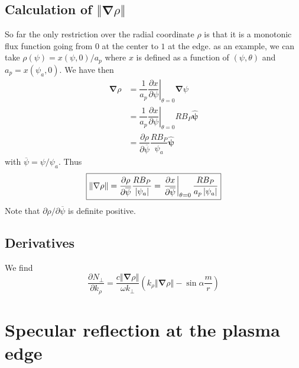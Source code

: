 \documentclass[a4paper,12pt]{article}%
\begin{document}
\subsection{Calculation of $\left\Vert \mathbf{\nabla}\rho\right\Vert $}

So far the only restriction over the radial coordinate $\rho$ is that it is a
monotonic flux function going from $0$ at the center to $1$ at the edge. as an
example, we can take $\rho\left(  \psi\right)  =x\left(  \psi,0\right)
/a_{p}$ where $x$ is defined as a function of $\left(  \psi,\theta\right)  $
and $a_{p}=x\left(  \psi_{a},0\right)  $. We have then
\begin{align}
\mathbf{\nabla}\rho &  =\dfrac{1}{a_{p}}\left.  \dfrac{\partial x}%
{\partial\psi}\right\vert _{\theta=0}\mathbf{\nabla}\psi\\
&  =\dfrac{1}{a_{p}}\left.  \dfrac{\partial x}{\partial\psi}\right\vert
_{\theta=0}RB_{P}\widehat{\mathbf{\psi}}\\
&  =\dfrac{\partial\rho}{\partial\overline{\psi}}\dfrac{RB_{P}}{\psi_{a}%
}\widehat{\mathbf{\psi}}%
\end{align}
with $\overline{\psi}=\psi/\psi_{a}$. Thus%
\begin{equation}
\fbox{$\left\Vert \mathbf{\nabla}\rho\right\Vert =\dfrac{\partial\rho
}{\partial\overline{\psi}}\dfrac{RB_{P}}{\left\vert \psi_{a}\right\vert
}=\left.  \dfrac{\partial x}{\partial\overline{\psi}}\right\vert _{\theta
=0}\dfrac{RB_{P}}{a_{p}\left\vert \psi_{a}\right\vert }$}%
\end{equation}
Note that $\partial\rho/\partial\overline{\psi}$ is definite positive.

\subsection{Derivatives}

We find
\begin{equation}
\frac{\partial N_{\bot}}{\partial k_{\rho}}=\dfrac{c\left\Vert \mathbf{\nabla
}\rho\right\Vert }{\omega k_{\bot}}\left(  k_{\rho}\left\Vert \mathbf{\nabla
}\rho\right\Vert -\sin\alpha\dfrac{m}{r}\right)
\end{equation}


\section{Specular reflection at the plasma edge}
\end{document}
